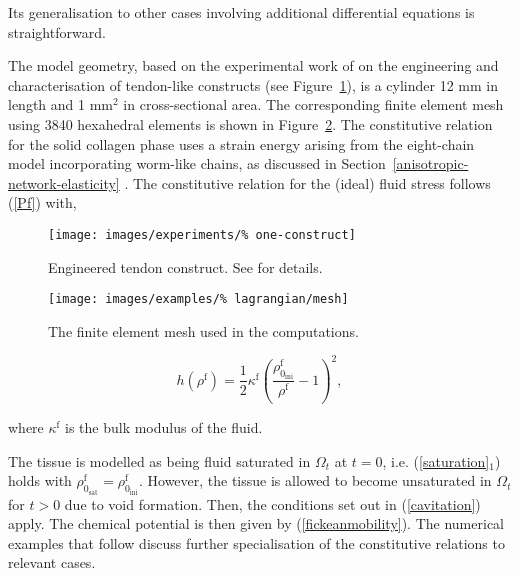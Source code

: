 \noindent Its generalisation to other cases involving additional
differential equations is straightforward.

The model geometry, based on the experimental work of \citet{Calve:04}
on the engineering and characterisation of tendon-like constructs (see
Figure~\ref{engconst}), is a cylinder 12 mm in length and 1 mm$^2$ in
cross-sectional area. The corresponding finite element mesh using 3840
hexahedral elements is shown in Figure~\ref{egmesh}. The constitutive
relation for the solid collagen phase uses a strain energy arising
from the eight-chain model incorporating worm-like chains, as
discussed in Section~\ref{anisotropic-network-elasticity} . The
constitutive relation for the (ideal) fluid stress follows (\ref{Pf})
with,

\begin{figure}[ht]
  \centering
  \texttt{[image: images/experiments/\%
    one-construct]}
  \caption{Engineered tendon construct. See \citet{Calve:04} for
    details.} 
  \label{engconst}
\end{figure}

\begin{figure}[ht]
  \centering
  \texttt{[image: images/examples/\%
    lagrangian/mesh]}
  \caption{The finite element mesh used in the computations.}
  \label{egmesh}
\end{figure}

\begin{equation}
 h(\rho^\mathrm{f}) =
\frac{1}{2}\kappa^\mathrm{f}\left(
\frac{\rho_{0_\mathrm{ini}}^\mathrm{f}}{\rho^\mathrm{f}}
- 1\right)^2,
\end{equation}

\noindent where $\kappa^\mathrm{f}$ is the bulk modulus of the fluid.

The tissue is modelled as being fluid saturated in $\Omega_t$ at $t =
0$, i.e. (\ref{saturation}$_1$) holds with
$\rho^\mathrm{f}_{0_\mathrm{sat}} =
\rho^\mathrm{f}_{0_\mathrm{ini}}$. However, the tissue is allowed to
become unsaturated in $\Omega_t$ for $t > 0$ due to void
formation. Then, the conditions set out in (\ref{cavitation})
apply. The chemical potential is then given by
(\ref{fickeanmobility}). The numerical examples that follow discuss
further specialisation of the constitutive relations to relevant
cases.

